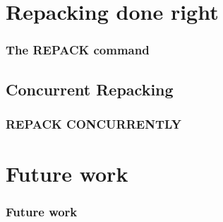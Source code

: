 \section{Repacking done right}
\begin{frame}
	\frametitle{The REPACK command}
\end{frame}

\subsection{Concurrent Repacking}
\begin{frame}
	\frametitle{REPACK CONCURRENTLY}

%
%
%
%
\end{frame}


\section{Future work}
\begin{frame}
  \frametitle{Future work}
\end{frame}
